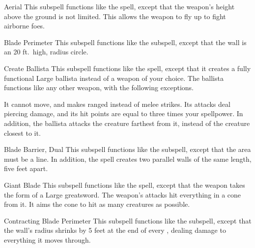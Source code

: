 \begin{ability}[\nth{2}]{Aerial}
This subspell functions like the  spell, except that the weapon's height above the ground is not limited.
This allows the weapon to fly up to fight airborne foes.
\end{ability}
\vspace{0.25em}


\begin{ability}[\nth{3}]{Blade Perimeter}
This subspell functions like the  subspell, except that the wall is an 20 ft.\ high, \areamed radius circle.
\end{ability}
\vspace{0.25em}


\begin{ability}[\nth{3}]{Create Ballista}
This subspell functions like the  spell, except that it creates a fully functional Large ballista instead of a weapon of your choice.
The ballista functions like any other weapon, with the following exceptions.

It cannot move, and makes ranged  instead of melee strikes.
Its attacks deal piercing damage, and its hit points are equal to three times your spellpower.
In addition, the ballista attacks the creature farthest from it, instead of the creature closest to it.
\end{ability}
\vspace{0.25em}


\begin{ability}[\nth{4}]{Blade Barrier, Dual}
This subspell functions like the  subspell, except that the area must be a line.
In addition, the spell creates two parallel walls of the same length, five feet apart.
\end{ability}
\vspace{0.25em}


\begin{ability}[\nth{4}]{Giant Blade}
This subspell functions like the  spell, except that the weapon takes the form of a Large greatsword.
The weapon's attacks hit everything in a \areasmall cone from it.
It aims the cone to hit as many creatures as possible.
\end{ability}
\vspace{0.25em}


\begin{ability}[\nth{5}]{Contracting Blade Perimeter}
This subspell functions like the  subspell, except that the wall's radius shrinks by 5 feet at the end of every , dealing damage to everything it moves through.
\end{ability}
\vspace{0.25em}


